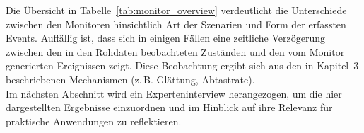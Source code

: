 \noindent
Die Übersicht in Tabelle~\ref{tab:monitor_overview} verdeutlicht die
Unterschiede
zwischen den Monitoren hinsichtlich Art der Szenarien und Form der
erfassten Events.
Auffällig ist, dass sich in einigen Fällen eine zeitliche Verzögerung zwischen
den in den Rohdaten beobachteten Zuständen und den vom Monitor generierten
Ereignissen zeigt. Diese Beobachtung ergibt sich aus den in Kapitel~3
beschriebenen
Mechanismen (z.\,B. Glättung, Abtastrate).\\

\noindent
Im nächsten Abschnitt wird ein Experteninterview herangezogen, um die hier
dargestellten Ergebnisse einzuordnen und im Hinblick auf ihre Relevanz für
praktische Anwendungen zu reflektieren.
